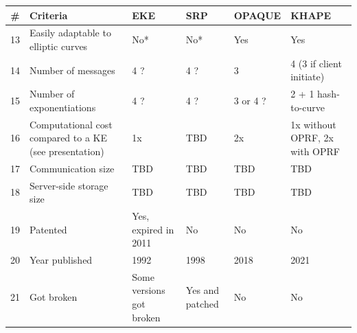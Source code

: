 \documentclass[../report.tex]{subfiles}
\begin{document}
\begin{center}
   \begin{tabular}{ | c | p{5cm} || p{2cm} | p{2cm} | p{2cm} | p{2cm} | }
     \hline
     \textbf{\#} & \textbf{Criteria} & \textbf{EKE} & \textbf{SRP} & \textbf{OPAQUE} & \textbf{KHAPE} \\ \hline
     
     13 & Easily adaptable to elliptic curves & No* & No* & Yes & Yes \\ \hline
     14 & Number of messages & 4 ? & 4 ? & 3 & 4 (3 if client initiate) \\ \hline
     15 & Number of exponentiations & 4 ? & 4 ? & 3 or 4 ? & 2 + 1 hash-to-curve \\ \hline
     16 & Computational cost compared to a KE (see \cite{KHAPE_Paper} presentation) & 1x & TBD & 2x & 1x without OPRF, 2x with OPRF \\ \hline
     17 & Communication size & TBD & TBD & TBD & TBD \\ \hline
     18 & Server-side storage size & TBD & TBD & TBD & TBD \\ \hline
     
     19 & Patented & Yes, expired in 2011 & No & No & No \\ \hline
     20 & Year published & 1992 & 1998 & 2018 & 2021 \\ \hline
     21 & Got broken & Some versions got broken & Yes and patched \cite{CAA} & No & No \\ \hline

     \end{tabular}
 \end{center}
\end{document}

